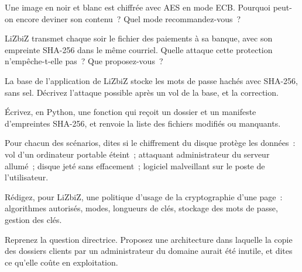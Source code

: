 \begin{boxexo}[title={\ding{45}\quad Exercice~3.4. ECB \niveaumoyen}]
Une image en noir et blanc est chiffrée avec AES en mode ECB. Pourquoi
peut-on encore deviner son contenu~? Quel mode recommandez-vous~?
\end{boxexo}

\begin{boxexo}[title={\ding{45}\quad Exercice~3.5. Empreinte ou MAC \niveaumoyen}]
LiZbiZ transmet chaque soir le fichier des paiements à sa banque, avec son
empreinte SHA-256 dans le même courriel. Quelle attaque cette protection
n'empêche-t-elle pas~? Que proposez-vous~?
\end{boxexo}

\begin{boxexo}[title={\ding{45}\quad Exercice~3.6. Mots de passe \niveaumoyen}]
La base de l'application de LiZbiZ stocke les mots de passe hachés avec
SHA-256, sans sel. Décrivez l'attaque possible après un vol de la base,
et la correction.
\end{boxexo}

\begin{boxexo}[title={\ding{45}\quad Exercice~3.7. Vérifier un lot \niveaumoyen}]
Écrivez, en Python, une fonction qui reçoit un dossier et un manifeste
d'empreintes SHA-256, et renvoie la liste des fichiers modifiés ou
manquants.
\end{boxexo}

\begin{boxexo}[title={\ding{45}\quad Exercice~3.8. Le chiffrement de disque \niveaumoyen}]
Pour chacun des scénarios, dites si le chiffrement du disque protège les
données~: vol d'un ordinateur portable éteint~; attaquant administrateur
du serveur allumé~; disque jeté sans effacement~; logiciel malveillant
sur le poste de l'utilisateur.
\end{boxexo}

\begin{boxexo}[title={\ding{45}\quad Exercice~3.9. Une politique \niveauexpert}]
Rédigez, pour LiZbiZ, une politique d'usage de la cryptographie d'une page~:
algorithmes autorisés, modes, longueurs de clés, stockage des mots de
passe, gestion des clés.
\end{boxexo}

\begin{boxexo}[title={\ding{45}\quad Exercice~3.10. Les données volées \niveauexpert}]
Reprenez la question directrice. Proposez une architecture dans laquelle
la copie des dossiers clients par un administrateur du domaine aurait été
inutile, et dites ce qu'elle coûte en exploitation.
\end{boxexo}

